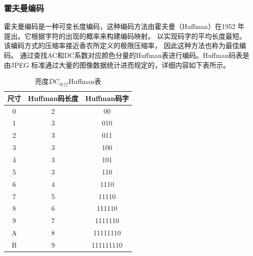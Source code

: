 \documentclass{article}
\numberwithin {equation}{section}
\begin{document}
\begin{spacing}{1.25}
    \subsubsection{霍夫曼编码}
      \vspace{1em}
      霍夫曼编码是一种可变长度编码，这种编码方法由霍夫曼（Huffman）在1952
      年提出\cite{huffman1952method}。它根据字符的出现的概率来构建编码映射。
      以实现码字的平均长度最短。该编码方式的压缩率接近香农所定义的极限压缩率，
      因此这种方法也称为最佳编码。
      通过查找AC和DC系数对应颜色分量的Huffman表进行编码。Huffman码表是由JPEG
      标准通过大量的图像数据统计进而规定的，详细内容如下表所示。
      \begin{table}[H]
        \centering
        \caption{亮度$DC_{diff}$Huffman表}
        \begin{tabular}{ccc}
          \toprule
          尺寸  & Huffman码长度 & Huffman码字\\
          \midrule
          0     & 2             & 00\\
          1     & 3             & 010\\
          2     & 3             & 011\\
          3     & 3             & 100\\
          4     & 3             & 101\\
          5     & 3             & 110\\
          6     & 4             & 1110\\
          7     & 5             & 11110\\
          8     & 6             & 111110\\
          9     & 7             & 1111110\\
          A     & 8             & 11111110\\
          B     & 9             & 111111110\\
          \bottomrule
        \end{tabular}
      \end{table}


\end{spacing}
\end{document}
